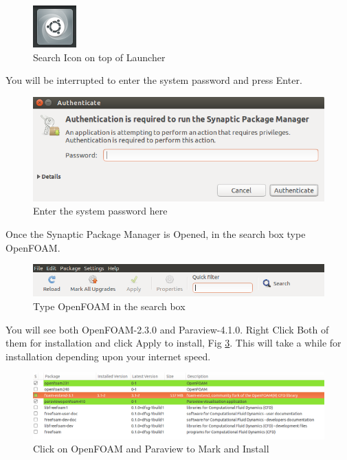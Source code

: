 \documentclass[a4paper,12pt]{report}
\begin{document}
\begin{figure}[h]  
\begin{center}  
\includegraphics[scale=0.8]{dash.png}
\caption{Search Icon on top of Launcher}
\label{search}
\end{center}  
\end{figure}

\flushleft You will be interrupted to enter the system password and press Enter.

\begin{figure}[h]  
\begin{center}  
\includegraphics[scale=0.55]{password.png}
\caption{Enter the system password here}
\end{center}  
\end{figure}
\vspace{1cm}
\flushleft Once the Synaptic Package Manager is Opened, in the search box type OpenFOAM.

\begin{figure}[ht]  
\begin{center}  
\includegraphics[scale=0.4]{searchbox.png}
\caption{Type OpenFOAM in the search box}
\label{searchbox}
\end{center}  
\end{figure}

\flushleft You will see both OpenFOAM-2.3.0 and Paraview-4.1.0. Right Click Both of them for installation and click Apply to install, Fig \ref{searchbox}. This will take a while for installation depending upon your internet speed.

\begin{figure}[ht]  
\begin{center}  
\includegraphics[scale=0.33]{mark.png}
\caption{Click on OpenFOAM and Paraview to Mark and Install}
\label{searchbox}
\end{center}  
\end{figure}
\end{document}
